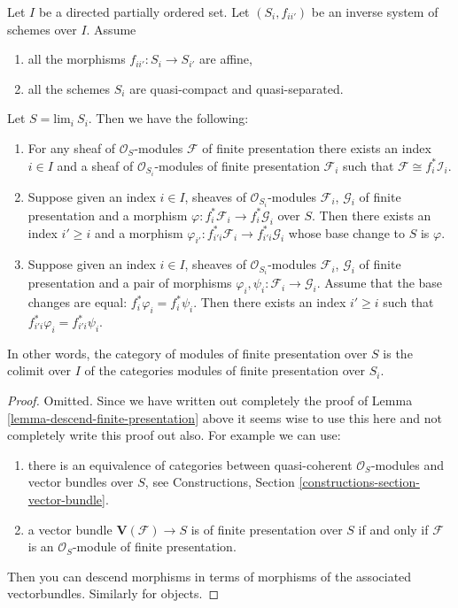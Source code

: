 \begin{lemma}
\label{lemma-descend-modules-finite-presentation}
Let $I$ be a directed partially ordered set.
Let $(S_i, f_{ii'})$ be an inverse system of schemes over $I$.
Assume
\begin{enumerate}
\item all the morphisms $f_{ii'} : S_i \to S_{i'}$ are affine,
\item all the schemes $S_i$ are quasi-compact and quasi-separated.
\end{enumerate}
Let $S = \text{lim}_i\ S_i$. Then we have the following:
\begin{enumerate}
\item For any sheaf of $\mathcal{O}_S$-modules
$\mathcal{F}$ of finite presentation there exists an index
$i \in I$ and a sheaf of $\mathcal{O}_{S_i}$-modules of finite
presentation $\mathcal{F}_i$ such that
$\mathcal{F} \cong f_i^*\mathcal{I}_i$.
\item Suppose given an index $i \in I$, sheaves
of $\mathcal{O}_{S_i}$-modules $\mathcal{F}_i$, $\mathcal{G}_i$
of finite presentation and a morphism
$\varphi : f_i^*\mathcal{F}_i \to f_i^*\mathcal{G}_i$ over $S$.
Then there exists an index $i' \geq i$ and a morphism
$\varphi_{i'} : f_{i'i}^*\mathcal{F}_i \to f_{i'i}^*\mathcal{G}_i$
whose base change to $S$ is $\varphi$.
\item Suppose given an index $i \in I$, sheaves of $\mathcal{O}_{S_i}$-modules
$\mathcal{F}_i$, $\mathcal{G}_i$ of finite presentation
and a pair of morphisms $\varphi_i, \psi_i : \mathcal{F}_i \to \mathcal{G}_i$.
Assume that the base changes are equal: $f_i^*\varphi_i = f_i^*\psi_i$.
Then there exists an index $i' \geq i$ such that
$f_{i'i}^*\varphi_i = f_{i'i}^*\psi_i$.
\end{enumerate}
In other words, the category of modules
of finite presentation over $S$ is the colimit over $I$
of the categories modules of finite presentation over $S_i$.
\end{lemma}

\begin{proof}
Omitted. Since we have written out completely the proof of
Lemma \ref{lemma-descend-finite-presentation} above
it seems wise to use this here and not completely write this
proof out also. For example we can use:
\begin{enumerate}
\item there is an equivalence of categories
between quasi-coherent $\mathcal{O}_S$-modules and
vector bundles over $S$, see
Constructions, Section \ref{constructions-section-vector-bundle}.
\item a vector bundle $\mathbf{V}(\mathcal{F}) \to S$ is
of finite presentation over $S$ if and only if $\mathcal{F}$
is an $\mathcal{O}_S$-module of finite presentation.
\end{enumerate}
Then you can descend morphisms in terms of morphisms of the
associated vectorbundles. Similarly for objects.
\end{proof}













